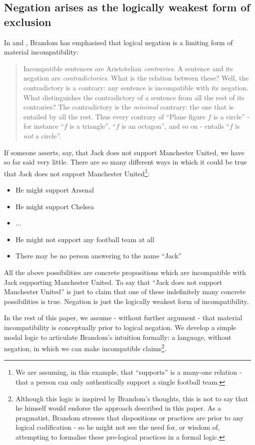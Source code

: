 \subsection{Negation arises as the logically weakest form of exclusion}

In \cite{brandom2} and \cite{brandom}, Brandom has emphasised that logical negation is a limiting form of material incompatibility:
\begin{quote}
Incompatible sentences are Aristotelian \emph{contraries}. A sentence and its negation are \emph{contradictories}. What is the relation between these? Well, the contradictory is a contrary: any sentence is incompatible with its negation. What distinguishes the contradictory of a sentence  from all the rest of its contraries? The contradictory is the \emph{minimal} contrary: the one that is entailed by all the rest. Thus every contrary of ``Plane figure $f$ is a circle'' - for instance ``$f$ is a triangle'', ``$f$ is an octagon'', and so on - entails ``$f$ is \emph{not} a circle''.
\end{quote}

If someone asserts, say, that Jack does not support Manchester United, we have so far said very little.  
There are so many different ways in which it could be true that Jack does not support Manchester United\footnote{We are assuming, in this example, that ``supports'' is a many-one relation - that a person can only authentically support a single football team.}:
\begin{itemize}
\item
He might support Arsenal
\item
He might support Chelsea
\item
...
\item
He might not support any football team at all
\item
There may be no person answering to the name ``Jack''
\end{itemize}
All the above possibilities are concrete propositions which are incompatible with Jack supporting Manchester United.
To say that ``Jack does not support Manchester United'' is just to claim that one of these indefinitely many concrete possibilities is true.
Negation is just the logically weakest form of incompatibility.

In the rest of this paper, we assume - without further argument - that material incompatibility is conceptually prior to logical negation.
We develop a simple
 modal logic to articulate Brandom's intuition formally: a language, without negation, in which we can make incompatible claims\footnote{Although this logic is inspired by Brandom's thoughts, this is not to say that he himself would endorse the approach described in this paper. As a pragmatist, Brandom stresses that dispositions or practices are prior to any logical codification - so he might not see the need for, or wisdom of, attempting to formalise these pre-logical practices in a formal logic.}.


